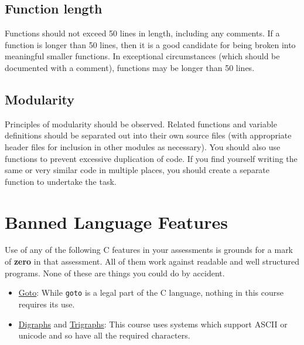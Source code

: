 \documentclass{article}
\begin{document}
\subsection{Function length}
Functions should not exceed 50 lines in length, including any comments.
If a function is longer than 50 lines, then it is a good candidate for being broken into meaningful smaller functions.
In exceptional circumstances (which should be documented with a comment), functions may be longer than 50 lines.

\subsection{Modularity}
Principles of modularity should be observed.
Related functions and variable definitions should be separated out into their own source files (with appropriate header files for inclusion in other modules as necessary).
You should also use functions to prevent excessive duplication of code.
If you find yourself writing the same or very similar code in multiple places, you should create a separate function to undertake the task.

\section{Banned Language Features}
Use of any of the following C features in your assessments is grounds for a mark of \textbf{zero} in that assessment.
All of them work against readable and well structured programs.
None of these are things you could do by accident.

\begin{itemize}
\item \underline{Goto}: While \texttt{goto} is a legal part of the C language, nothing in this course requires its use.
\item \underline{Digraphs} and \underline{Trigraphs}: This course uses systems which support ASCII or unicode and so have all the required characters.
\end{itemize}
\end{document}
